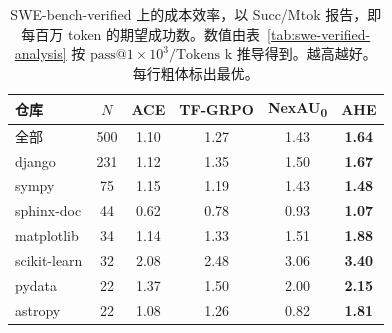 \begin{table}[t]
    \centering
    \small
    \setlength{\tabcolsep}{6pt}
    \renewcommand{\arraystretch}{1.05}
    \caption{SWE-bench-verified 上的成本效率，以 Succ/Mtok 报告，即每百万 token 的期望成功数。数值由表~\ref{tab:swe-verified-analysis} 按 $\mathrm{pass@1} \times 10^{3} / \text{Tokens k}$ 推导得到。越高越好。每行粗体标出最优。}
    \label{tab:swe-verified-succ-mtok}
    \begin{tabular}{lccccc}
        \toprule
        仓库 & $N$ & ACE & TF-GRPO & NexAU\textsubscript{0} & \textbf{AHE} \\
        \midrule
        全部            & 500 & 1.10 & 1.27 & 1.43 & \textbf{1.64} \\
        \midrule
        django         & 231 & 1.12 & 1.35 & 1.50 & \textbf{1.67} \\
        sympy          &  75 & 1.15 & 1.19 & 1.43 & \textbf{1.48} \\
        sphinx-doc     &  44 & 0.62 & 0.78 & 0.93 & \textbf{1.07} \\
        matplotlib     &  34 & 1.14 & 1.33 & 1.51 & \textbf{1.88} \\
        scikit-learn   &  32 & 2.08 & 2.48 & 3.06 & \textbf{3.40} \\
        pydata         &  22 & 1.37 & 1.50 & 2.00 & \textbf{2.15} \\
        astropy        &  22 & 1.08 & 1.26 & 0.82 & \textbf{1.81} \\
        \bottomrule
    \end{tabular}
\end{table}
